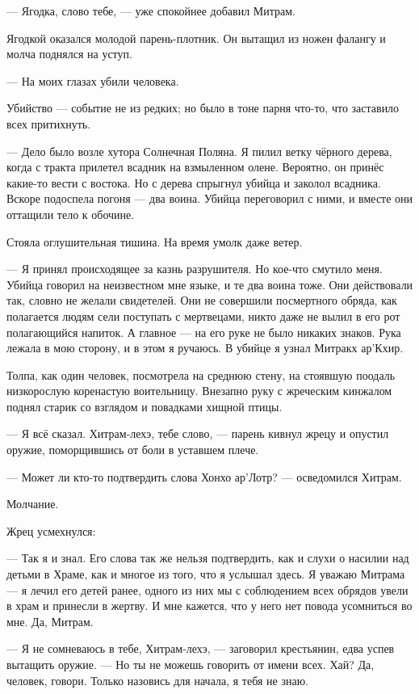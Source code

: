 --- Ягодка, слово тебе, --- уже спокойнее добавил Митрам.

Ягодкой оказался молодой парень-плотник.
Он вытащил из ножен фалангу и молча поднялся на уступ.

--- На моих глазах убили человека.

Убийство --- событие не из редких;
но было в тоне парня что-то, что заставило всех притихнуть.

--- Дело было возле хутора Солнечная Поляна.
Я пилил ветку чёрного дерева, когда с тракта прилетел всадник на взмыленном олене.
Вероятно, он принёс какие-то вести с востока.
Но с дерева спрыгнул убийца и заколол всадника.
Вскоре подоспела погоня --- два воина.
Убийца переговорил с ними, и вместе они оттащили тело к обочине.

Стояла оглушительная тишина.
На время умолк даже ветер.

--- Я принял происходящее за казнь разрушителя.
Но кое-что смутило меня.
Убийца говорил на неизвестном мне языке, и те два воина тоже.
Они действовали так, словно не желали свидетелей.
Они не совершили посмертного обряда, как полагается людям сели поступать с мертвецами, никто даже не вылил в его рот полагающийся напиток.
А главное --- на его руке не было никаких знаков.
Рука лежала в мою сторону, и в этом я ручаюсь.
В убийце я узнал Митракх ар’Кхир.

Толпа, как один человек, посмотрела на среднюю стену, на стоявшую поодаль низкорослую коренастую воительницу.
Внезапно руку с жреческим кинжалом поднял старик со взглядом и повадками хищной птицы.

--- Я всё сказал.
Хитрам-лехэ, тебе слово, --- парень кивнул жрецу и опустил оружие, поморщившись от боли в уставшем плече.

--- Может ли кто-то подтвердить слова Хонхо ар’Лотр? --- осведомился Хитрам.

Молчание.

Жрец усмехнулся:

--- Так я и знал.
Его слова так же нельзя подтвердить, как и слухи о насилии над детьми в Храме, как и многое из того, что я услышал здесь.
Я уважаю Митрама --- я лечил его детей ранее, одного из них мы с соблюдением всех обрядов увели в храм и принесли в жертву.
И мне кажется, что у него нет повода усомниться во мне.
Да, Митрам.

--- Я не сомневаюсь в тебе, Хитрам-лехэ, --- заговорил крестьянин, едва успев вытащить оружие.
--- Но ты не можешь говорить от имени всех.
Хай?
Да, человек, говори.
Только назовись для начала, я тебя не знаю.

